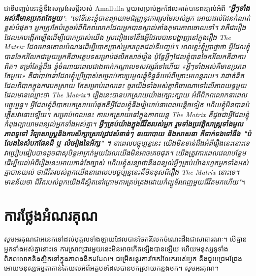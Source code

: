 \documentclass[10pt,twocolumn,letterpaper]{article}
\begin{document}
	ជាទីបញ្ជប់នេះខ្ញុំនឹងសម្រង់​សម្តីរបស់ Amallulla មួយសម្រាប់អ្នកដែលគាត់បានពន្យល់អំពី \textit{"\textbf{អ្វីៗទាំងអស់គឺមានប្រភពតែមួយ}"}: \textit{"នៅទីនេះខ្ញុំបានព្យាយាមជំរុញនូវការស្រមៃរបស់អ្នក អោយដល់ដែនកំណត់ខ្ពស់បំផុត។ អ្នកត្រូវតែបំភ្លេចអំពីពិភពលោកដែលអ្នកបានស្គាល់តាំងកុមារភាពចោលទៅ។ វាគឺជារឿងដែលគេបង្កើតឡើងដើម្បីបោកប្រាស់យើង ស្រដៀងទៅនឹងអ្វីដែលបានបង្ហាញនៅក្នុងរឿង The Matrix ដែលមានគោលបំណងដើម្បីបោកប្រាស់អ្នករហូតដល់ទីបញ្ចប់។ ពេលខ្លះខ្ញុំប្រាថ្នាថា អ្វីដែលខ្ញុំបានចែករំលែកជាមួយអ្នកគឺជាអត្ថបទសម្រាប់ផលិតសាច់រឿង  ប៉ុន្តែអ្វីៗដែលខ្ញុំបានចែករំលែកគឺជាការពិត។ ទម្រាំតែខ្ញុំដឹង ខ្ញុំចំណាយពេលជាងពាក់កណ្តាលទសវត្សរ៍ទៅហើយ «អ្វីៗទាំងអស់គឺមានប្រភពតែមួយ» គឺជាបាវចនាដែលខ្ញុំប្រើប្រាស់សម្រាប់ការប្រមូលផ្តុំទិន្នន័យអំពីគ្រោះមហន្តរាយ។ វាជាគំនិតដែលពិបាកក្នុងការបកស្រាយ តែសម្រាប់ពេលនេះ ចូរយើងទាំងអស់គ្នាពិចារណាទៅលើភាពយន្តមួយដែលមានឈ្មោះថា The Matrix។ រឿងនេះបានបកស្រាយយ៉ាងក្បោះក្បាយ អំពីពិភពលោកនាពេលបច្ចុប្បន្ន។ អ្វីដែលខ្ញុំពិបាកបកស្រាយបំផុតគឺអ្វីដែលខ្ញុំនឹងរៀបរាប់នាពេលបន្តិចទៀត ហើយខ្ញុំមិនបានបំភ្លើសវានោះឡើយ។  សម្រាប់ពេលនេះ ការបកស្រាយនៅក្នុងភាពយន្ត The Matrix គឺដូចជាអ្វីដែលខ្ញុំកំពុងព្យាយាមពន្យល់អ្នកទាំងអស់គ្នា។ \textbf{អ្វីៗគ្រប់យ៉ាងក្នុងជីវិតរបស់អ្នក រួមទាំងប្រវត្តិសាស្ត្រទាំងមូល ភាពទូទៅ វិទ្យាសាស្ត្រនិងការសិក្សាស្រាវជ្រាវសំខាន់ៗ  នយោបាយ និងសាសនា គឺទាក់ទងទៅនឹង "បំលែងនៃសំបកផែនដី ឬ លំអៀងនៃអ័ក្ស" ។} នាពេលបច្ចុប្បន្ននេះ យើងមិនទាន់ដឹងអំពីរឿងនេះនោះទេ វាប្រៀបធៀបបានដូចជាសុបិន្តអាក្រក់មួយដែលយើងមិនអាចគេចផុត។ យើងត្រូវការពេលវេលាបន្ថែមដើម្បីយល់អំពីរឿងនេះអោយកាន់តែច្បាស់ ហើយខ្ញុំសន្យាថានឹងពន្យល់អ្វីៗគ្រប់យ៉ាងរហូតអ្នកទាំងអស់គ្នាបានយល់ ថាជីវិតរបស់ពួកយើងនាពេលបបច្ចប្បន្ននេះគឺមិនខុសពីរឿង The Matrix នោះទេ។ មានន័យថា ជីវិតរបស់ពួកយើងគឺស្ថិតនៅក្រោមការគ្រប់គ្រងដោយកំព្យូទ័រពេញមួយជីវិតមកហើយ"}\cite{33,34}។

\section{ការថ្លែងអំណរគុណ}

	សូមអរគុណជាអនេកទៅដល់បុគ្គលទាំងឡាយ​ដែលបានចែករំលែកចំណេះដឹងជាសាធារណៈ។ បើគ្មានអ្នកទាំងអស់គ្នានោះទេ ការស្រាវជ្រាវមួយនេះមិនអាចកើតឡើងបានឡើយ ហើយមនុស្សទូទាំងពិភពលោកនិងស្ថិតនៅក្នុងភាពងងឹតដដែល។ ជម្រើសនូវការចែករំលែករបស់អ្នក នឹងជួយជ្រមជ្រែងអោយមនុស្សធម្មតាកាន់តែយល់អំពីអត្ថបទដែលបានបកស្រាយកន្លងមក។ សូមអរគុណ។ 
\clearpage
\twocolumn

{\small
\renewcommand{\refname}{ឯកសារយោង}


}
\end{document}
